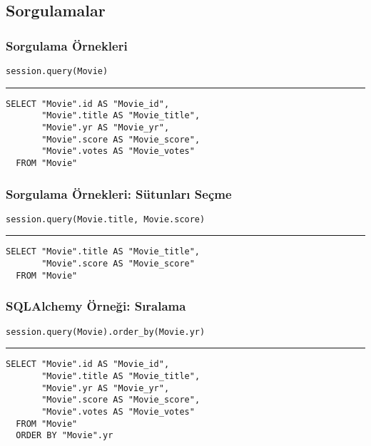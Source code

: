 \documentclass[dvipsnames]{beamer}
\theoremstyle{plain}
\begin{document}
\subsection{Sorgulamalar}

\begin{frame}[fragile]
  \frametitle{Sorgulama Örnekleri}

  \begin{lstlisting}
session.query(Movie)
  \end{lstlisting}
  \hrule

  \begin{lstlisting}[language=FullSQL]
SELECT "Movie".id AS "Movie_id",
       "Movie".title AS "Movie_title",
       "Movie".yr AS "Movie_yr",
       "Movie".score AS "Movie_score",
       "Movie".votes AS "Movie_votes"
  FROM "Movie"
  \end{lstlisting}
\end{frame}

\begin{frame}[fragile]
  \frametitle{Sorgulama Örnekleri: Sütunları Seçme}

  \begin{lstlisting}
session.query(Movie.title, Movie.score)
  \end{lstlisting}
  \hrule

  \begin{lstlisting}[language=FullSQL]
SELECT "Movie".title AS "Movie_title",
       "Movie".score AS "Movie_score"
  FROM "Movie"
  \end{lstlisting}
\end{frame}

\begin{frame}[fragile]
  \frametitle{SQLAlchemy Örneği: Sıralama}

  \begin{lstlisting}
session.query(Movie).order_by(Movie.yr)
  \end{lstlisting}
  \hrule

  \begin{lstlisting}[language=FullSQL]
SELECT "Movie".id AS "Movie_id",
       "Movie".title AS "Movie_title",
       "Movie".yr AS "Movie_yr",
       "Movie".score AS "Movie_score",
       "Movie".votes AS "Movie_votes"
  FROM "Movie"
  ORDER BY "Movie".yr
  \end{lstlisting}
\end{frame}
\end{document}
